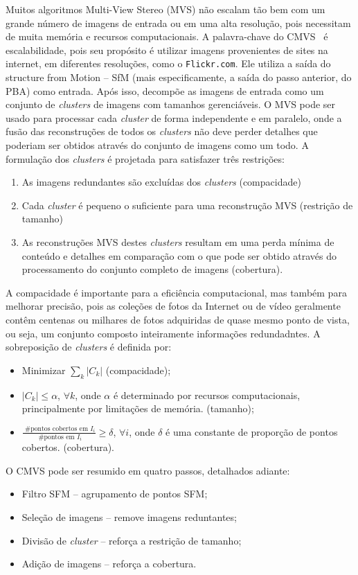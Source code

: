 Muitos algoritmos Multi-View Stereo (MVS) não escalam tão bem com um grande
número de imagens de entrada ou em uma alta resolução, pois necessitam de muita
memória e recursos computacionais. A palavra-chave do
CMVS~\cite{visualSfMPMVS,wu2013towards,li2013improving} é escalabilidade, pois
seu propósito é utilizar imagens provenientes de sites na internet, em
diferentes resoluções, como o \texttt{Flickr.com}.  Ele utiliza a saída do structure from
Motion -- SfM (mais especificamente, a saída do passo anterior, do PBA) 
como entrada. Após isso, decompõe as imagens de entrada como um conjunto de
\emph{clusters} de imagens com tamanhos gerenciáveis. O MVS pode ser usado para
processar cada \emph{cluster} de forma independente e em paralelo, onde a fusão
das reconstruções de todos os \emph{clusters} não deve perder detalhes que
poderiam ser obtidos através do conjunto de imagens como um todo.
A formulação dos \emph{clusters} é projetada para satisfazer três restrições: 
\begin{enumerate}[leftmargin=2.5cm]
\item{As imagens redundantes são excluídas dos \emph{clusters} (compacidade)}
\item{Cada \emph{cluster} é pequeno o suficiente para uma reconstrução MVS (restrição de tamanho)}
\item{As reconstruções MVS destes \emph{clusters} resultam em uma perda mínima de conteúdo e detalhes em comparação com o que pode ser obtido através do processamento do conjunto completo de imagens (cobertura).}
\end{enumerate}
A compacidade é importante para a eficiência computacional, mas também para
melhorar precisão, pois as coleções de fotos da Internet ou de vídeo geralmente
contêm centenas ou milhares de fotos adquiridas de quase mesmo ponto de vista,
ou seja, um conjunto composto inteiramente informações redundadntes.  A
sobreposição de \emph{clusters} é definida por:
\begin{itemize}[leftmargin=2.5cm]
\item Minimizar $\sum_{k} |C_k|$ (compacidade);
\item $|C_k| \le \alpha$, $\forall k$, onde $\alpha$ é determinado por recursos computacionais, principalmente por limitações de memória. (tamanho);
\item $\frac{\text{ \# pontos cobertos em } I_i}{\text{ \# pontos em } I_i} \ge
  \delta$, $\forall i$, onde $\delta$ é uma constante de proporção de pontos cobertos. (cobertura).
\end{itemize}
O CMVS pode ser resumido em quatro passos, detalhados adiante:
\begin{itemize}[leftmargin=2.5cm]
\item Filtro SFM -- agrupamento de pontos SFM;
\item Seleção de imagens -- remove imagens reduntantes;
\item Divisão de \emph{cluster} -- reforça a restrição de tamanho;
\item Adição de imagens -- reforça a cobertura.
\end{itemize}

